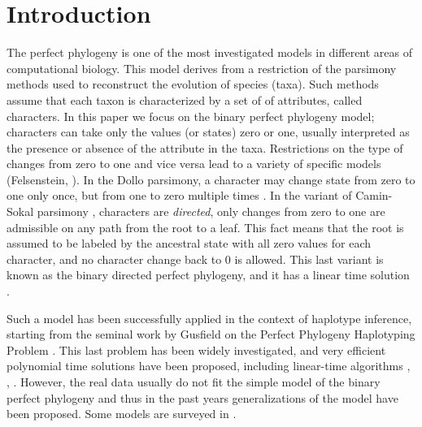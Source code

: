 \documentclass{llncs}
\begin{document}
\section{Introduction}



The perfect phylogeny   is one of the most investigated models  in different areas of computational biology.
This model derives from a restriction of the parsimony methods  used to reconstruct the evolution of species (taxa).
Such methods assume that each taxon is characterized by a set of of attributes, called characters. In this paper we focus on the binary perfect phylogeny model; characters can take only the values (or states) zero or one, usually interpreted as the presence or absence of the attribute in the taxa.  Restrictions on the type of  changes from zero to one and vice versa lead to a variety of specific models  (Felsenstein, \cite{Fel}). In the  Dollo parsimony, a character may change state from zero to one only once, but from one to zero multiple times  \cite{Pr1}.  In the variant of Camin-Sokal parsimony \cite{CS},  characters are {\em directed}, only changes from zero to one are admissible on any path from the root to a leaf. This fact means that  the root is assumed to be labeled by the ancestral state with all zero values  for each character, and  no character change back to 0 is allowed. This last variant is  known as the binary directed perfect phylogeny, and it has  a linear time solution \cite{Gus91}. 

Such a  model has been successfully applied  in the context of haplotype inference, starting from the seminal work by Gusfield on the   Perfect Phylogeny Haplotyping Problem \cite{Gus02}.  This last problem has been widely investigated, and very efficient polynomial time solutions have been proposed, including   linear-time algorithms \cite{Gus06}, \cite{Mu}, \cite{Boniz}. However, the real data usually do not fit the simple model of the binary perfect phylogeny and thus in the past years generalizations of the model have been proposed.  Some models are surveyed in \cite{FB00}.
\end{document}
